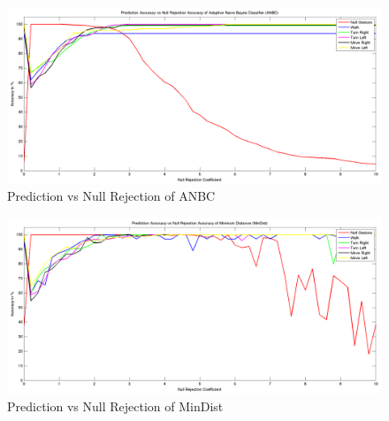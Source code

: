 \begin{figure}
	\hspace{-15 mm}
	\includegraphics[width=185mm]{figures/result/test-accuracy-anbc.png}
	\caption{Prediction vs Null Rejection of ANBC}
	\label{ev:accuracy:anbc}
\end{figure}
\begin{figure} 	
	\hspace{-15 mm}
	\includegraphics[width=185mm]{figures/result/test-accuracy-mindist.png}
	\caption{Prediction vs Null Rejection of MinDist}
	\label{ev:accuracy:mindist}
\end{figure}